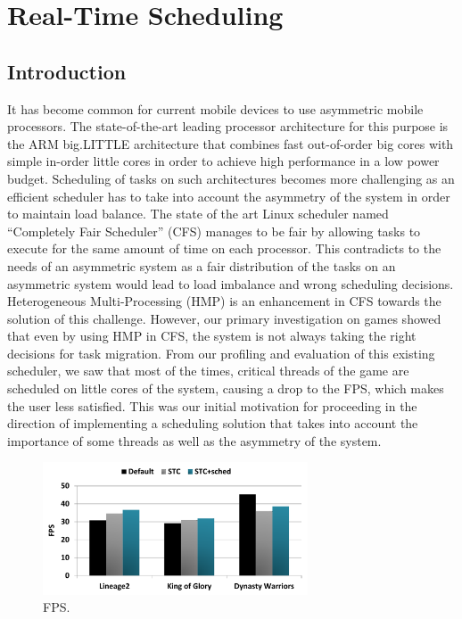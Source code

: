 \chapter{Real-Time Scheduling}

\section{Introduction}
It has become common for current mobile devices to use asymmetric mobile processors. 
The state-of-the-art leading processor architecture for this purpose is the ARM big.LITTLE architecture that combines fast out-of-order big cores with simple in-order little cores in order to achieve high performance in a low power budget. 
Scheduling of tasks on such architectures becomes more challenging as an efficient scheduler has to take into account the asymmetry of the system in order to maintain load balance. 
The state of the art Linux scheduler named “Completely Fair Scheduler” (CFS) manages to be fair by allowing tasks to execute for the same amount of time on each processor. 
This contradicts to the needs of an asymmetric system as a fair distribution of the tasks on an asymmetric system would lead to load imbalance and wrong scheduling decisions. 
Heterogeneous Multi-Processing (HMP) is an enhancement in CFS towards the solution of this challenge. 
However, our primary investigation on games showed that even by using HMP in CFS, the system is not always taking the right decisions for task migration. 
From our profiling and evaluation of this existing scheduler, we saw that most of the times, critical threads of the game are scheduled on little cores of the system, causing a drop to the FPS, which makes the user less satisfied. 
This was our initial motivation for proceeding in the direction of implementing a scheduling solution that takes into account the importance of some threads as well as the asymmetry of the system.


\begin{figure}[t]%
	\centering
	\includegraphics[width=0.7\textwidth]{figures/FPS.pdf}
	\caption{FPS.}
	\label{fig:FPS}
\end{figure}

